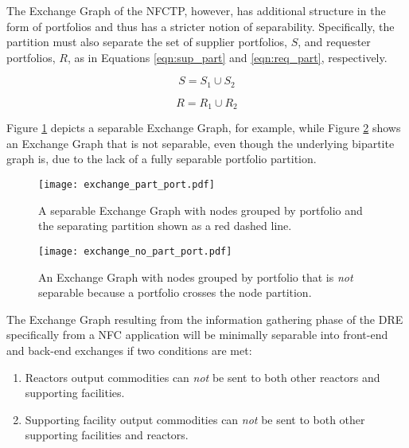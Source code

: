 The Exchange Graph of the NFCTP, however, has additional structure in the form
of portfolios and thus has a stricter notion of separability. Specifically, the
partition must also separate the set of supplier portfolios, $S$, and requester
portfolios, $R$, as in Equations \ref{eqn:sup_part} and \ref{eqn:req_part},
respectively.

\begin{equation}\label{eqn:sup_part}
  S = S_{1} \cup S_{2}
\end{equation}

\begin{equation}\label{eqn:req_part}
  R = R_{1} \cup R_{2}
\end{equation}

Figure \ref{fig:port_part} depicts a separable Exchange Graph, for example,
while Figure \ref{fig:port_no_part} shows an Exchange Graph that is not
separable, even though the underlying bipartite graph is, due to the lack of a
fully separable portfolio partition.

\begin{figure}
  \begin{center}
    \texttt{[image: exchange\_part\_port.pdf]}
    \caption[]{
      \label{fig:port_part}
      A separable Exchange Graph with nodes grouped by portfolio and the
      separating partition shown as a red dashed line.}
  \end{center}
\end{figure}

\begin{figure}
  \begin{center}
    \texttt{[image: exchange\_no\_part\_port.pdf]}
    \caption[]{
      \label{fig:port_no_part}
      An Exchange Graph with nodes grouped by portfolio that is \textit{not}
      separable because a portfolio crosses the node partition.}
  \end{center}
\end{figure}

The Exchange Graph resulting from the information gathering phase of the DRE
specifically from a NFC application will be minimally separable into front-end
and back-end exchanges if two conditions are met:

\begin{enumerate}
  \item Reactors output commodities can \textit{not} be sent to both other
    reactors and supporting facilities.

  \item Supporting facility output commodities can \textit{not} be sent to both
    other supporting facilities and reactors.
\end{enumerate}



